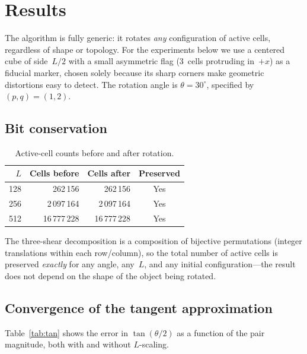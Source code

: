 \documentclass[12pt,a4paper]{article}
\begin{document}
\section{Results}
\label{sec:results}

The algorithm is fully generic: it rotates \emph{any} configuration
of active cells, regardless of shape or topology.  For the
experiments below we use a centered cube of side~$L/2$ with a small
asymmetric flag (3~cells protruding in~$+x$) as a fiducial marker,
chosen solely because its sharp corners make geometric distortions
easy to detect.  The rotation angle is $\theta=30^\circ$, specified
by $(p,q)=(1,2)$.

\subsection{Bit conservation}

\begin{table}[h]
\centering
\caption{Active-cell counts before and after rotation.}
\label{tab:bits}
\begin{tabular}{@{}rrrc@{}}
\toprule
$L$ & Cells before & Cells after & Preserved \\
\midrule
128  & 262\,156 & 262\,156 & Yes \\
256  & 2\,097\,164 & 2\,097\,164 & Yes \\
512  & 16\,777\,228 & 16\,777\,228 & Yes \\
\bottomrule
\end{tabular}
\end{table}

The three-shear decomposition is a composition of bijective
permutations (integer translations within each row/column), so the
total number of active cells is preserved \emph{exactly} for any
angle, any~$L$, and any initial configuration---the result does not
depend on the shape of the object being rotated.

\subsection{Convergence of the tangent approximation}

Table~\ref{tab:tan} shows the error in $\tan(\theta/2)$ as a function
of the pair magnitude, both with and without $L$-scaling.
\end{document}
